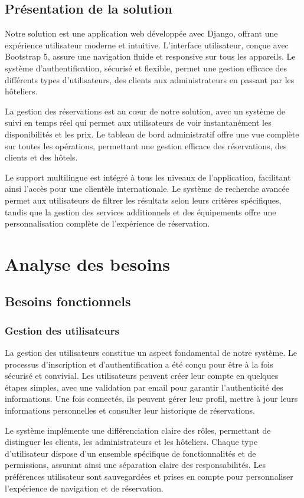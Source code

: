 \documentclass[12pt,a4paper]{report}
\begin{document}
\section{Présentation de la solution}
Notre solution est une application web développée avec Django, offrant une expérience utilisateur moderne et intuitive. L'interface utilisateur, conçue avec Bootstrap 5, assure une navigation fluide et responsive sur tous les appareils. Le système d'authentification, sécurisé et flexible, permet une gestion efficace des différents types d'utilisateurs, des clients aux administrateurs en passant par les hôteliers.

La gestion des réservations est au cœur de notre solution, avec un système de suivi en temps réel qui permet aux utilisateurs de voir instantanément les disponibilités et les prix. Le tableau de bord administratif offre une vue complète sur toutes les opérations, permettant une gestion efficace des réservations, des clients et des hôtels.

Le support multilingue est intégré à tous les niveaux de l'application, facilitant ainsi l'accès pour une clientèle internationale. Le système de recherche avancée permet aux utilisateurs de filtrer les résultats selon leurs critères spécifiques, tandis que la gestion des services additionnels et des équipements offre une personnalisation complète de l'expérience de réservation.

\chapter{Analyse des besoins}
\section{Besoins fonctionnels}
\subsection{Gestion des utilisateurs}
La gestion des utilisateurs constitue un aspect fondamental de notre système. Le processus d'inscription et d'authentification a été conçu pour être à la fois sécurisé et convivial. Les utilisateurs peuvent créer leur compte en quelques étapes simples, avec une validation par email pour garantir l'authenticité des informations. Une fois connectés, ils peuvent gérer leur profil, mettre à jour leurs informations personnelles et consulter leur historique de réservations.

Le système implémente une différenciation claire des rôles, permettant de distinguer les clients, les administrateurs et les hôteliers. Chaque type d'utilisateur dispose d'un ensemble spécifique de fonctionnalités et de permissions, assurant ainsi une séparation claire des responsabilités. Les préférences utilisateur sont sauvegardées et prises en compte pour personnaliser l'expérience de navigation et de réservation.
\end{document}
